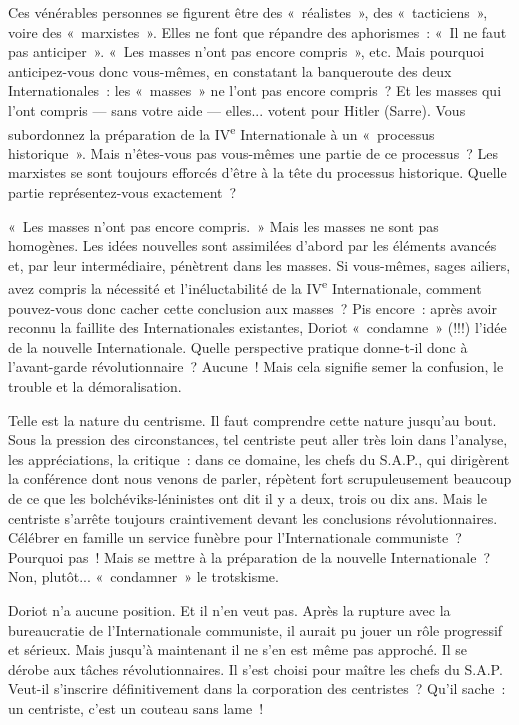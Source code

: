 \documentclass[french,twoside]{book} %
\begin{document}
Ces vénérables personnes se figurent être des « réalistes », des « tacticiens », voire des « marxistes ». Elles ne font que répandre des aphorismes : « Il ne faut pas anticiper ». « Les masses n’ont pas encore compris », etc. Mais pourquoi anticipez-vous donc vous-mêmes, en constatant la banqueroute des deux Internationales : les « masses » ne l’ont pas encore compris ? Et les masses qui  l’ont compris — sans votre aide — elles... votent pour Hitler (Sarre). Vous subordonnez la préparation de la IV\textsuperscript{e} Internationale à un « processus historique ». Mais n’êtes-vous pas vous-mêmes une partie de ce processus ? Les marxistes se sont toujours efforcés d’être à la tête du processus historique. Quelle partie représentez-vous exactement ?\par
« Les masses n’ont pas encore compris. » Mais les masses ne sont pas homogènes. Les idées nouvelles sont assimilées d’abord par les éléments avancés et, par leur intermédiaire, pénètrent dans les masses. Si vous-mêmes, sages ailiers, avez compris la nécessité et l’inéluctabilité de la IV\textsuperscript{e} Internationale, comment pouvez-vous donc cacher cette conclusion aux masses ? Pis encore : après avoir reconnu la faillite des Internationales existantes, Doriot « condamne » (!!!) l’idée de la nouvelle Internationale. Quelle perspective pratique donne-t-il donc à l’avant-garde révolutionnaire ? Aucune ! Mais cela signifie semer la confusion, le trouble et la démoralisation.\par
Telle est la nature du centrisme. Il faut comprendre cette nature jusqu’au bout. Sous la pression des circonstances, tel centriste peut aller très loin dans l’analyse, les appréciations, la critique : dans ce domaine, les chefs du S.A.P., qui dirigèrent la conférence dont nous venons de parler, répètent fort scrupuleusement beaucoup de ce que les bolchéviks-léninistes ont dit il y a deux, trois ou dix ans. Mais le centriste s’arrête toujours craintivement devant les conclusions révolutionnaires. Célébrer en famille un service funèbre pour l’Internationale communiste ? Pourquoi pas ! Mais se mettre à la préparation de la nouvelle Internationale ? Non, plutôt... « condamner » le trotskisme.\par
Doriot n’a aucune position. Et il n’en veut pas. Après la rupture avec la bureaucratie de l’Internationale communiste, il aurait pu jouer un rôle progressif et sérieux.  Mais jusqu’à maintenant il ne s’en est même pas approché. Il se dérobe aux tâches révolutionnaires. Il s’est choisi pour maître les chefs du S.A.P. Veut-il s’inscrire définitivement dans la corporation des centristes ? Qu’il sache : un centriste, c’est un couteau sans lame !
\end{document}
